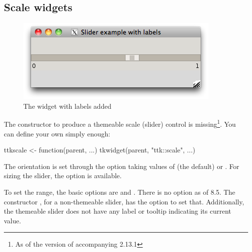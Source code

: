 



\subsection{Scale widgets}
\label{sec:tcltk:scale-widgets}


\begin{figure}
  \centering
  \includegraphics[width=.5\textwidth]{fig-tcltk-slider-labels.png}
  \caption{The  widget with labels added}
  \label{fig:tcltk-slider-labels}
\end{figure}

The  constructor to produce a themeable scale
(slider) control is missing\footnote{As of the version of 
  accompanying \R{} 2.13.1}. You can define your own simply enough:
\begin{Schunk}
\begin{Sinput}
 ttkscale <- function(parent, ...) 
   tkwidget(parent, "ttk::scale", ...)
\end{Sinput}
\end{Schunk}

The orientation is set through the option 
taking values of  (the default) or
. For sizing the slider, the 
option is available.  

To set the range, the basic options are  and
. There is no  option as of \TK\/
8.5. The constructor , for a non-themeable slider,
has the option  to set that. Additionally,
the themeable slider does not have any label or tooltip indicating its
current value.



